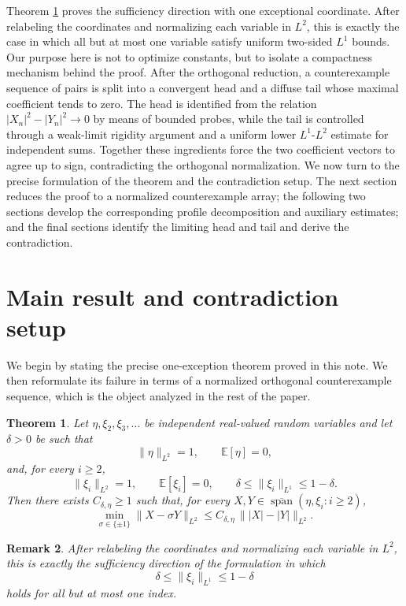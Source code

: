 \documentclass[11pt]{amsart}
\newtheorem{theorem}{Theorem}
\newtheorem{remark}[theorem]{Remark}
\newcommand{\E}{\mathbb E}
\newcommand{\Span}{\operatorname{span}}
\begin{document}
Theorem \ref{thm:main} proves the sufficiency direction with
one exceptional coordinate. After relabeling the coordinates and normalizing
each variable in $L^2$, this is exactly the case in which all but at most one
variable satisfy uniform two-sided $L^1$ bounds. Our purpose here is not to
optimize constants, but to isolate a compactness mechanism behind the proof.
After the orthogonal reduction, a counterexample sequence of pairs is split
into a convergent head and a diffuse tail whose maximal coefficient tends to
zero. The head is identified from the relation $|X_n|^2-|Y_n|^2 \to 0$ by
means of bounded probes, while the tail is controlled through a weak-limit
rigidity argument and a uniform lower $L^1$-$L^2$ estimate for independent
sums. Together these ingredients force the two coefficient vectors to agree up
to sign, contradicting the orthogonal normalization. We now turn to the precise
formulation of the theorem and the contradiction setup. The next section
reduces the proof to a normalized counterexample array; the following two
sections develop the corresponding profile decomposition and auxiliary
estimates; and the final sections identify the limiting head and tail and
derive the contradiction.

\section{Main result and contradiction setup}

We begin by stating the precise one-exception theorem proved in this note. We
then reformulate its failure in terms of a normalized orthogonal
counterexample sequence, which is the object analyzed in the rest of the
paper.

\begin{theorem}\label{thm:main}
Let $\eta,\xi_2,\xi_3,\dots$ be independent real-valued random variables and
let $\delta > 0$ be such that
\[
\|\eta\|_{L^2} = 1,
\qquad
\E[\eta] = 0,
\]
and, for every $i \ge 2$,
\[
\|\xi_i\|_{L^2} = 1,
\qquad
\E[\xi_i] = 0,
\qquad
\delta \le \|\xi_i\|_{L^1} \le 1-\delta.
\]
Then there exists $C_{\delta,\eta} \ge 1$ such that, for every
$X,Y \in \overline{\Span}(\eta,\xi_i : i \ge 2)$,
\[
\min_{\sigma \in \{\pm 1\}} \|X-\sigma Y\|_{L^2}
\le
C_{\delta,\eta} \, \bigl\| |X|-|Y| \bigr\|_{L^2}.
\]
\end{theorem}

\begin{remark}
After relabeling the coordinates and normalizing each variable in $L^2$, this
is exactly the sufficiency direction of the formulation in which
\[
\delta \le \|\xi_i\|_{L^1} \le 1-\delta
\]
holds for all but at most one index.
\end{remark}
\end{document}
